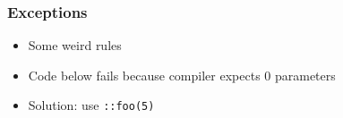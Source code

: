 \documentclass{../ucll-slides}
\begin{document}
\begin{frame}
  \frametitle{Exceptions}
  \begin{itemize}
    \item Some weird rules
    \item Code below fails because compiler expects 0 parameters
    \item Solution: use {\tt ::foo(5)}
  \end{itemize}
\end{frame}



\end{document}
